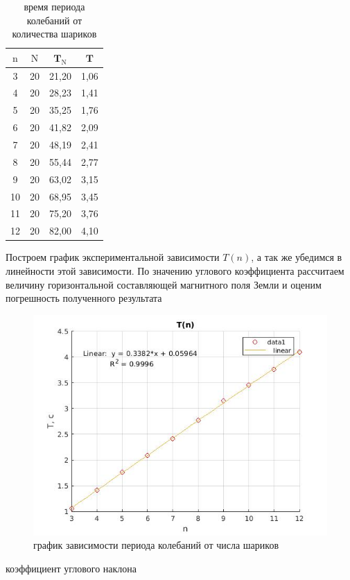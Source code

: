 \documentclass[a4paper, 12pt]{article}%
\begin{document}
\newpage

\begin{table}[!h]
\begin{center}
\begin{tabular}{|c|c|c|c|}
\hline $\mathrm{n}$ & $\mathrm{N}$ & $\mathbf{T}_{\mathrm{N}}$ & $\boldsymbol{T}$ \\
\hline 3 & 20 & 21,20 & 1,06 \\
\hline 4 & 20 & 28,23 & 1,41 \\
\hline 5 & 20 & 35,25 & 1,76 \\
\hline 6 & 20 & 41,82 & 2,09 \\
\hline 7 & 20 & 48,19 & 2,41 \\
\hline 8 & 20 & 55,44 & 2,77 \\
\hline 9 & 20 & 63,02 & 3,15 \\
\hline 10 & 20 & 68,95 & 3,45 \\
\hline 11 & 20 & 75,20 & 3,76 \\
\hline 12 & 20 & 82,00 & 4,10 \\
\hline
\end{tabular}
\caption{время периода колебаний от количества шариков}
\end{center}
\end{table}

Построем график экспериментальной зависимости $T(n)$, а так же убедимся в линейности этой зависимости. По значению углового коэффициента рассчитаем величину горизонтальной составляющей магнитного поля Земли и оценим погрешность полученного результата


\begin{figure}[h]
    \centering
    \includegraphics[width = 9 cm]{graph1_s.jpg}
    \caption{график зависимости периода колебаний от числа шариков}
    \label{msh1}
\end{figure}

коэффициент углового наклона 
\end{document}
